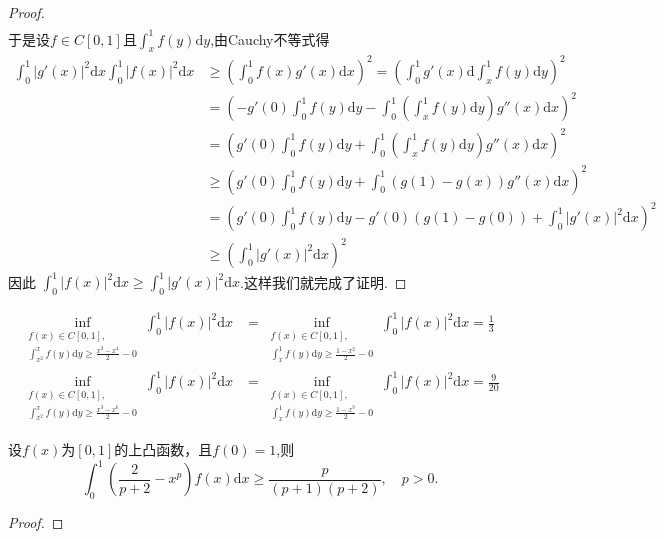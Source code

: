 \documentclass[../../main.tex]{subfiles}
\begin{document}
\begin{proof}
\begin{align*}
\end{align*}
于是设$f\in C\left[ 0,1 \right]\text{且}\int_x^1{f\left( y \right) \mathrm{d}y}$,由Cauchy不等式得
\begin{align*}
\int_0^1 |g'(x)|^2 \mathrm{d}x \int_0^1 |f(x)|^2 \mathrm{d}x &\geqslant \left( \int_0^1 f(x) g'(x) \mathrm{d}x \right)^2 = \left( \int_0^1 g'(x) \mathrm{d} \int_x^1 f(y) \mathrm{d}y \right)^2 \\
&= \left( -g'(0) \int_0^1 f(y) \mathrm{d}y - \int_0^1 \left( \int_x^1 f(y) \mathrm{d}y \right) g''(x) \mathrm{d}x \right)^2 \\
&= \left( g'(0) \int_0^1 f(y) \mathrm{d}y + \int_0^1 \left( \int_x^1 f(y) \mathrm{d}y \right) g''(x) \mathrm{d}x \right)^2 \\
&\geqslant \left( g'(0) \int_0^1 f(y) \mathrm{d}y + \int_0^1 (g(1) - g(x)) g''(x) \mathrm{d}x \right)^2 \\
&= \left( g'(0) \int_0^1 f(y) \mathrm{d}y - g'(0) (g(1) - g(0)) + \int_0^1 |g'(x)|^2 \mathrm{d}x \right)^2 \\
&\geqslant \left( \int_0^1 |g'(x)|^2 \mathrm{d}x \right)^2
\end{align*}
因此 $\int_0^1 |f(x)|^2 \mathrm{d}x \geqslant \int_0^1 |g'(x)|^2 \mathrm{d}x$.这样我们就完成了证明.
\end{proof}

\begin{corollary}
\begin{align*}
\inf_{\substack{f(x) \in C[0,1], \\ \int_{x^2}^x f(y) \mathrm{d}y \geqslant \frac{x^2 - x^4}{2} - 0}} \int_0^1 |f(x)|^2 \mathrm{d}x &= \inf_{\substack{f(x) \in C[0,1], \\ \int_x^1 f(y) \mathrm{d}y \geqslant \frac{1 - x^2}{2} - 0}} \int_0^1 |f(x)|^2 \mathrm{d}x = \frac{1}{3} \\
\inf_{\substack{f(x) \in C[0,1], \\ \int_{x^2}^x f(y) \mathrm{d}y \geqslant \frac{x^3 - x^6}{2} - 0}} \int_0^1 |f(x)|^2 \mathrm{d}x &= \inf_{\substack{f(x) \in C[0,1], \\ \int_x^1 f(y) \mathrm{d}y \geqslant \frac{1 - x^3}{2} - 0}} \int_0^1 |f(x)|^2 \mathrm{d}x = \frac{9}{20}
\end{align*}
\end{corollary}

\begin{proposition}\label{proposition:积分不等式零点拟合}
设$f(x)$为$[0,1]$的上凸函数，且$f(0)=1$,则
$$\int_0^1 \left( \frac{2}{p+2} - x^p \right) f(x) \mathrm{d}x \geqslant \frac{p}{(p+1)(p+2)},\quad p>0.$$
\end{proposition}
\begin{proof}

\end{proof}
\end{document}
